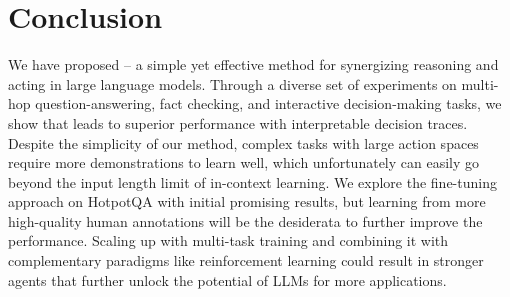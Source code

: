 \section{Conclusion}
We have proposed \model{} -- a simple yet effective method for synergizing reasoning and acting in large language models. Through a diverse set of experiments on multi-hop question-answering, fact checking, and interactive decision-making tasks, we show that \model{} leads to superior performance with interpretable decision traces. Despite the simplicity of our method, complex tasks with large action spaces require more demonstrations to learn well, which unfortunately can easily go beyond the input length limit of in-context learning. We explore the fine-tuning approach on HotpotQA with initial promising results, but learning from more high-quality human annotations will be the desiderata to further improve the performance. Scaling up \model{} with multi-task training and combining it with complementary paradigms like reinforcement learning could result in stronger agents that further unlock the potential of LLMs for more applications.

